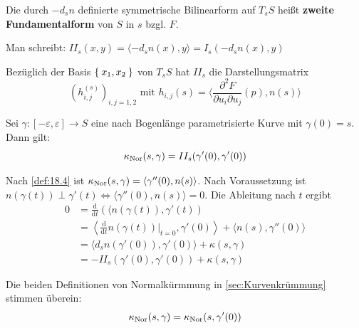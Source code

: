 \begin{definition}%
    Die durch $-d_s n$ definierte symmetrische Bilinearform auf $T_s S$ heißt
    \textbf{zweite Fundamentalform} von $S$ in $s$ bzgl. $F$.

    Man schreibt: $II_s(x,y) =  \langle - d_s n(x), y \rangle = I_s (-d_s n(x), y)$
\end{definition}

\begin{bemerkung}%
    Bezüglich der Basis $\Set{x_1, x_2}$ von $T_s S$ hat $II_s$ die Darstellungsmatrix
    \[(h^{(s)}_{i,j})_{i,j=1,2} \text{ mit } h_{i,j}(s) = \langle \frac{\partial^2 F}{\partial u_i \partial u_j} (p), n(s) \rangle \]
\end{bemerkung}

\begin{proposition}\label{prop:19.6}%
    Sei $\gamma:[- \varepsilon, \varepsilon] \rightarrow S$ eine nach Bogenlänge
    parametrisierte Kurve mit $\gamma(0) = s$. Dann gilt:
    \[\kappa_{\textnormal{Nor}}(s, \gamma) = II_s(\gamma'(0), \gamma'(0))\]
\end{proposition}

\begin{beweis}
    Nach \cref{def:18.4} ist $\kappa_{\textnormal{Nor}}(s, \gamma) = \langle \gamma''(0), n(s) \rangle$.
    Nach Voraussetzung ist $n(\gamma(t)) \perp \gamma'(t) \Leftrightarrow \langle \gamma''(0), n(s) \rangle = 0$.
    Die Ableitung nach $t$ ergibt 
    \begin{align*}
        0 &= \frac{\mathrm{d}}{\mathrm{d}t}(\langle n (\gamma(t)), \gamma'(t))\\
        &= \left \langle \frac{\mathrm{d}}{\mathrm{d}t} n(\gamma(t)) \Bigr |_{t=0}, \gamma'(0) \right \rangle + \langle n(s), \gamma''(0) \rangle\\
        &= \langle d_s n (\gamma'(0)), \gamma'(0) \rangle + \kappa(s,\gamma)\\
        &= - II_s(\gamma'(0), \gamma'(0)) + \kappa(s, \gamma)
    \end{align*}
\end{beweis}

\begin{folgerung}%
    Die beiden Definitionen von Normalkürmmung in \cref{sec:Kurvenkrümmung} stimmen
    überein:
    \[\kappa_{\textnormal{Nor}}(s, \gamma) = \kappa_{\textnormal{Nor}}(s, \gamma'(0))\]
\end{folgerung}

